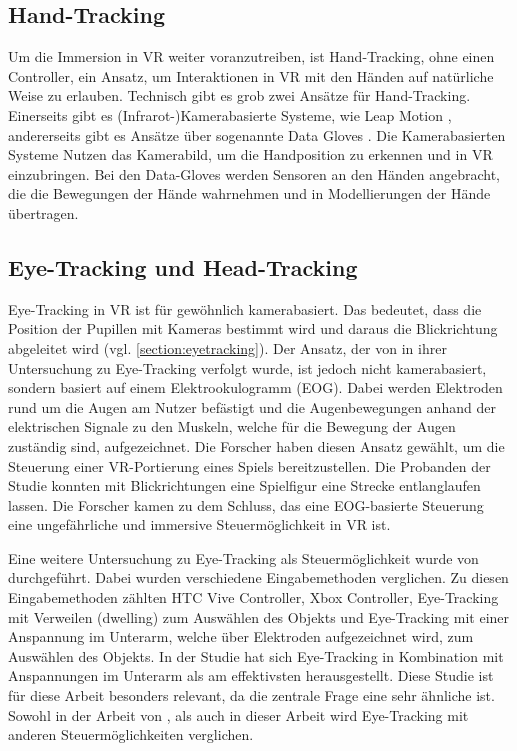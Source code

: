 \subsection{Hand-Tracking}
Um die Immersion in \ac{VR} weiter voranzutreiben, ist Hand-Tracking, ohne einen Controller, ein Ansatz, um Interaktionen in \ac{VR} mit den Händen auf natürliche Weise zu erlauben. 
Technisch gibt es grob zwei Ansätze für Hand-Tracking. Einerseits gibt es (Infrarot-)Kamerabasierte Systeme, wie Leap Motion \cite{Leap.2014}, andererseits gibt es Ansätze über sogenannte Data Gloves \cite{S.Lee.2017}. Die Kamerabasierten Systeme Nutzen das Kamerabild, um die Handposition zu erkennen und in \ac{VR} einzubringen. Bei den Data-Gloves werden Sensoren an den Händen angebracht, die die Bewegungen der Hände wahrnehmen und in Modellierungen der Hände übertragen. 

\subsection{Eye-Tracking und Head-Tracking}
\label{eyetrackingVR}
Eye-Tracking in \ac{VR} ist für gewöhnlich kamerabasiert. Das bedeutet, dass die Position der Pupillen mit Kameras bestimmt wird und daraus die Blickrichtung abgeleitet wird (vgl. \autoref{section:eyetracking})\cite{Blake.2013}. Der Ansatz, der von \citeauthor{D.Kumar.2016} in ihrer Untersuchung zu Eye-Tracking verfolgt wurde, ist jedoch nicht kamerabasiert, sondern basiert auf einem Elektrookulogramm (\ac{EOG}). Dabei werden Elektroden rund um die Augen am Nutzer befästigt und die Augenbewegungen anhand der elektrischen Signale zu den Muskeln, welche für die Bewegung der Augen zuständig sind, aufgezeichnet. Die Forscher haben diesen Ansatz gewählt, um die Steuerung einer \ac{VR}-Portierung eines Spiels bereitzustellen. Die Probanden der Studie konnten mit Blickrichtungen eine Spielfigur eine Strecke entlanglaufen lassen. Die Forscher kamen zu dem Schluss, das eine \ac{EOG}-basierte Steuerung eine ungefährliche und immersive Steuermöglichkeit in \ac{VR} ist. \cite{D.Kumar.2016}

Eine weitere Untersuchung zu Eye-Tracking als Steuermöglichkeit wurde von \citeauthor{Pai.2019} durchgeführt. Dabei wurden verschiedene Eingabemethoden verglichen. Zu diesen Eingabemethoden zählten HTC Vive Controller, Xbox Controller, Eye-Tracking mit Verweilen (dwelling) zum Auswählen des Objekts und Eye-Tracking mit einer Anspannung im Unterarm, welche über Elektroden aufgezeichnet wird, zum Auswählen des Objekts. In der Studie hat sich Eye-Tracking in Kombination mit Anspannungen im Unterarm als am effektivsten herausgestellt. \cite{Pai.2019} Diese Studie ist für diese Arbeit besonders relevant, da die zentrale Frage eine sehr ähnliche ist. Sowohl in der Arbeit von \citeauthor{Pai.2019}, als auch in dieser Arbeit wird Eye-Tracking mit anderen Steuermöglichkeiten verglichen.


